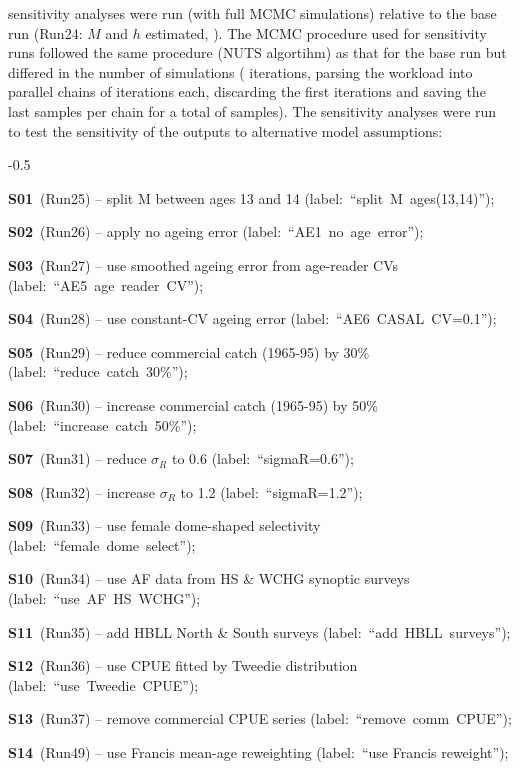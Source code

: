 \documentclass[11pt]{book}
\newcommand{\pc}{\%}
\begin{document}
 sensitivity analyses were run (with full MCMC simulations) relative to the base run (Run24: $M$ and $h$ estimated, ).
The MCMC procedure used for sensitivity runs followed the same procedure (NUTS algortihm) as that for the base run but differed in the number of simulations (\nSimsSens{} iterations, parsing the workload into \nChains{} parallel chains of \cSimsSens{} iterations each, discarding the first \cBurnSens{} iterations and saving the last \cSamps{} samples per chain for a total of \Nmcmc{} samples).
The sensitivity analyses were run to test the sensitivity of the outputs to alternative model assumptions:
\begin{itemize_csas}{-0.5}{}
  \item \textbf{S01}~(Run25)  -- split M between ages 13 and 14  (label:~``split~M~ages(13,14)'');
  \item \textbf{S02}~(Run26)  -- apply no ageing error  (label:~``AE1~no~age~error'');
  \item \textbf{S03}~(Run27)  -- use smoothed ageing error from age-reader CVs  (label:~``AE5~age~reader~CV'');
  \item \textbf{S04}~(Run28)  -- use constant-CV ageing error  (label:~``AE6~CASAL~CV=0.1'');
  \item \textbf{S05}~(Run29)  -- reduce commercial catch (1965-95) by 30\pc{}  (label:~``reduce~catch~30\pc{}'');
  \item \textbf{S06}~(Run30)  -- increase commercial catch (1965-95) by 50\pc{}  (label:~``increase~catch~50\pc{}'');
  \item \textbf{S07}~(Run31)  -- reduce $\sigma_R$ to 0.6  (label:~``sigmaR=0.6'');
  \item \textbf{S08}~(Run32)  -- increase $\sigma_R$ to 1.2  (label:~``sigmaR=1.2'');
  \item \textbf{S09}~(Run33)  -- use female dome-shaped selectivity  (label:~``female~dome~select'');
  \item \textbf{S10}~(Run34) -- use AF data from HS \& WCHG synoptic surveys (label:~``use~AF~HS~WCHG'');
  \item \textbf{S11}~(Run35) -- add HBLL North \& South surveys (label:~``add~HBLL~surveys'');
  \item \textbf{S12}~(Run36) -- use CPUE fitted by Tweedie distribution (label:~``use~Tweedie~CPUE'');
  \item \textbf{S13}~(Run37) -- remove commercial CPUE series (label:~``remove~comm~CPUE'');
  \item \textbf{S14}~(Run49) -- use Francis mean-age reweighting (label:~``use Francis reweight'');
\end{itemize_csas}
\end{document}
